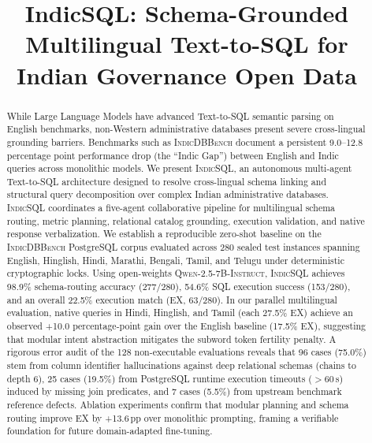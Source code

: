 \documentclass[conference]{IEEEtran}
\begin{document}
\title{IndicSQL: Schema-Grounded Multilingual Text-to-SQL for Indian Governance Open Data}

\author{
}

\maketitle

\begin{abstract}
While Large Language Models have advanced Text-to-SQL semantic parsing on English benchmarks, non-Western administrative databases present severe cross-lingual grounding barriers. Benchmarks such as \textsc{IndicDBBench} document a persistent 9.0--12.8 percentage point performance drop (the ``Indic Gap'') between English and Indic queries across monolithic models. We present \textsc{IndicSQL}, an autonomous multi-agent Text-to-SQL architecture designed to resolve cross-lingual schema linking and structural query decomposition over complex Indian administrative databases. \textsc{IndicSQL} coordinates a five-agent collaborative pipeline for multilingual schema routing, metric planning, relational catalog grounding, execution validation, and native response verbalization. We establish a reproducible zero-shot baseline on the \textsc{IndicDBBench} PostgreSQL corpus evaluated across 280 sealed test instances spanning English, Hinglish, Hindi, Marathi, Bengali, Tamil, and Telugu under deterministic cryptographic locks. Using open-weights \textsc{Qwen-2.5-7B-Instruct}, \textsc{IndicSQL} achieves 98.9\% schema-routing accuracy (277/280), 54.6\% SQL execution success (153/280), and an overall 22.5\% execution match (EX, 63/280). In our parallel multilingual evaluation, native queries in Hindi, Hinglish, and Tamil (each 27.5\% EX) achieve an observed +10.0 percentage-point gain over the English baseline (17.5\% EX), suggesting that modular intent abstraction mitigates the subword token fertility penalty. A rigorous error audit of the 128 non-executable evaluations reveals that 96 cases (75.0\%) stem from column identifier hallucinations against deep relational schemas (chains to depth 6), 25 cases (19.5\%) from PostgreSQL runtime execution timeouts ($>60$\,s) induced by missing join predicates, and 7 cases (5.5\%) from upstream benchmark reference defects. Ablation experiments confirm that modular planning and schema routing improve EX by +13.6\,pp over monolithic prompting, framing a verifiable foundation for future domain-adapted fine-tuning.
\end{abstract}
\end{document}
